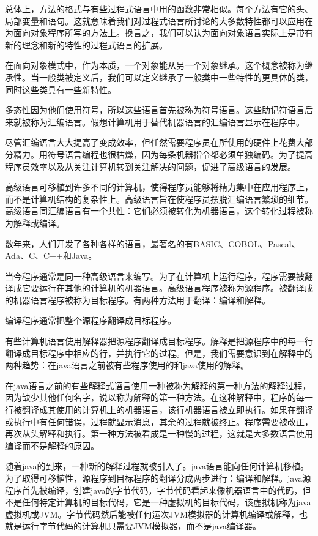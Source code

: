 总体上，方法的格式与有些过程式语言中用的函数非常相似。每个方法有它的头、局部变量和语句。这就意味着我们对过程式语言所讨论的大多数特性都可以应用在为面向对象程序所写的方法上。换言之，我们可以认为面向对象语言实际上是带有新的理念和新的特性的过程式语言的扩展。

在面向对象模式中，作为本质，一个对象能从另一个对象继承。这个概念被称为继承性。当一般类被定义后，我们可以定义继承了一般类中一些特性的更具体的类，同时这些类具有一些新特性。

多态性因为他们使用符号，所以这些语言首先被称为符号语言。这些助记符语言后来就被称为汇编语言。假想计算机用于替代机器语言的汇编语言显示在程序中。

尽管汇编语言大大提高了变成效率，但任然需要程序员在所使用的硬件上花费大部分精力。用符号语言编程也很枯燥，因为每条机器指令都必须单独编码。为了提高程序员效率以及从关注计算机转到关注解决的问题，促进了高级语言的发展。

高级语言可移植到许多不同的计算机，使得程序员能够将精力集中在应用程序上，而不是计算机结构的复杂性上。高级语言旨在使程序员摆脱汇编语言繁琐的细节。高级语言同汇编语言有一个共性：它们必须被转化为机器语言，这个转化过程被称为解释或编译。

数年来，人们开发了各种各样的语言，最著名的有BASIC、COBOL、Pascal、Ada、C、C++和Java。

当今程序通常是同一种高级语言来编写。为了在计算机上运行程序，程序需要被翻译成它要运行在其他的计算机的机器语言。高级语言程序被称为源程序。被翻译成的机器语言程序被称为目标程序。有两种方法用于翻译：编译和解释。

编译程序通常把整个源程序翻译成目标程序。

有些计算机语言使用解释器把源程序翻译成目标程序。解释是把源程序中的每一行翻译成目标程序中相应的行，并执行它的过程。但是，我们需要意识到在解释中的两种趋势：在java语言之前被有些程序使用的和java使用的解释。

在java语言之前的有些解释式语言使用一种被称为解释的第一种方法的解释过程，因为缺少其他任何名字，说以称为解释的第一种方法。在这种解释中，程序的每一行被翻译成其使用的计算机上的机器语言，该行机器语言被立即执行。如果在翻译或执行中有任何错误，过程就显示消息，其余的过程就被终止。程序需要被改正，再次从头解释和执行。第一种方法被看成是一种慢的过程，这就是大多数语言使用编译而不是解释的原因。

随着java的到来，一种新的解释过程就被引入了。java语言能向任何计算机移植。为了取得可移植性，源程序到目标程序的翻译分成两步进行：编译和解释。java源程序首先被编译，创建java的字节代码，字节代码看起来像机器语言中的代码，但不是任何特定计算机的目标代码，它是一种虚拟机的目标代码，该虚拟机称为java虚拟机或JVM。字节代码然后能被任何运次JVM模拟器的计算机编译或解释，也就是运行字节代码的计算机只需要JVM模拟器，而不是java编译器。

